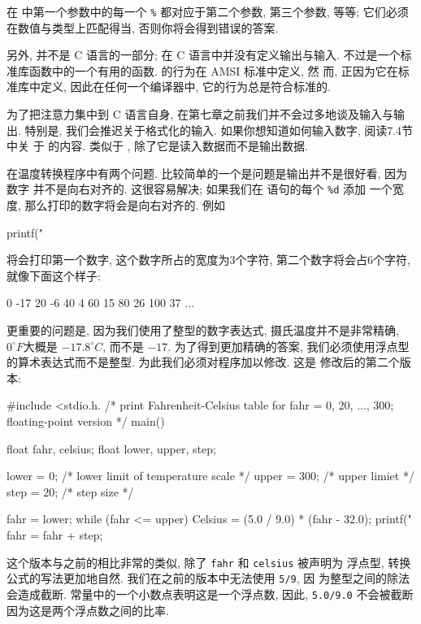 在 \printf 中第一个参数中的每一个 \verb"%" 都对应于第二个参数, 第三个参数, 
等等; 它们必须在数值与类型上匹配得当, 否则你将会得到错误的答案.

另外, \printf 并不是 C 语言的一部分; 在 C 语言中并没有定义输出与输入. \printf
不过是一个标准库函数中的一个有用的函数. \printf 的行为在 AMSI 标准中定义, 然
而, 正因为它在标准库中定义, 因此在任何一个编译器中, 它的行为总是符合标准的.

为了把注意力集中到 C 语言自身, 在第七章之前我们并不会过多地谈及输入与输出. 
特别是, 我们会推迟关于格式化的输入. 如果你想知道如何输入数字, 阅读7.4节中关
于 \scanf 的内容. \scanf 类似于 \printf, 除了它是读入数据而不是输出数据.

在温度转换程序中有两个问题. 比较简单的一个是问题是输出并不是很好看, 因为数字
并不是向右对齐的. 这很容易解决; 如果我们在 \printf 语句的每个 \verb"%d" 添加
一个宽度, 那么打印的数字将会是向右对齐的. 例如 
\begin{myverbatim}
    printf("%
\end{myverbatim}
将会打印第一个数字, 这个数字所占的宽度为3个字符, 第二个数字将会占6个字符, 
就像下面这个样子:
\begin{myverbatim}
    0       -17 
   20        -6 
   40         4 
   60        15 
   80        26 
  100        37 
  ...
\end{myverbatim}
更重要的问题是, 因为我们使用了整型的数字表达式, 摄氏温度并不是非常精确, 
$0^\circ F$大概是 $-17.8^\circ C$, 而不是 $-17$. 为了得到更加精确的答案,
我们必须使用浮点型的算术表达式而不是整型. 为此我们必须对程序加以修改. 这是 
修改后的第二个版本:
\begin{myverbatim}
    #include <stdio.h.
    /* print Fahrenheit-Celsius table 
       for fahr = 0, 20, ..., 300; floating-point version */
    main()
    {
        float   fahr, celsius;
        float   lower, upper, step;

        lower   = 0;    /* lower limit of temperature scale */
        upper   = 300;  /* upper limiet */
        step    = 20;   /* step size */

        fahr = lower;
        while (fahr <= upper) {
            Celsius = (5.0 / 9.0) * (fahr - 32.0);
            printf("%
            fahr = fahr + step;
        }
    }
\end{myverbatim}
这个版本与之前的相比非常的类似, 除了 \verb"fahr" 和 \verb"celsius" 被声明为
浮点型, 转换公式的写法更加地自然. 我们在之前的版本中无法使用 \verb"5/9", 因
为整型之间的除法会造成截断. 常量中的一个小数点表明这是一个浮点数, 因此, 
\verb"5.0/9.0" 不会被截断因为这是两个浮点数之间的比率.


